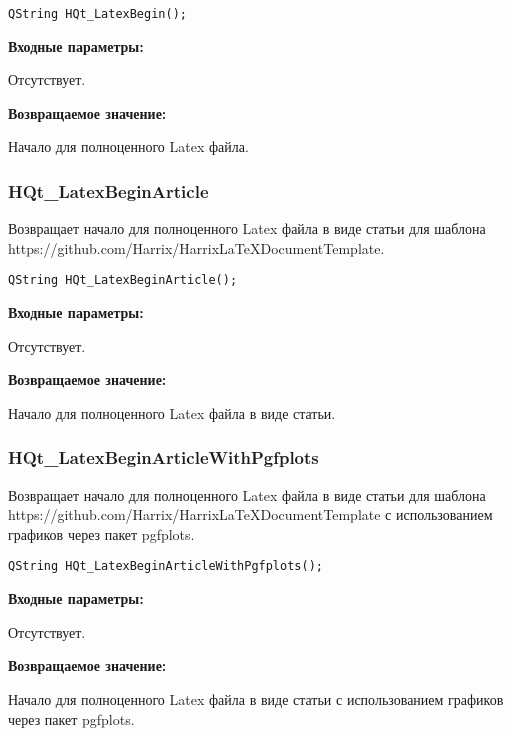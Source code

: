 \documentclass[a4paper,12pt]{article}
\begin{document}
\begin{lstlisting}[label=code_syntax_HQt_LatexBegin,caption=Синтаксис]
QString HQt_LatexBegin();
\end{lstlisting}

\textbf{Входные параметры:}

Отсутствует.

\textbf{Возвращаемое значение:}

Начало для полноценного Latex файла.


\subsubsection{HQt\_LatexBeginArticle}\label{HQt_LatexBeginArticle}

Возвращает начало для полноценного Latex файла в виде статьи для шаблона https://github.com/Harrix/HarrixLaTeXDocumentTemplate.


\begin{lstlisting}[label=code_syntax_HQt_LatexBeginArticle,caption=Синтаксис]
QString HQt_LatexBeginArticle();
\end{lstlisting}

\textbf{Входные параметры:}

Отсутствует.

\textbf{Возвращаемое значение:}

Начало для полноценного Latex файла в виде статьи.


\subsubsection{HQt\_LatexBeginArticleWithPgfplots}\label{HQt_LatexBeginArticleWithPgfplots}

Возвращает начало для полноценного Latex файла в виде статьи для шаблона https://github.com/Harrix/HarrixLaTeXDocumentTemplate с использованием графиков через пакет pgfplots.


\begin{lstlisting}[label=code_syntax_HQt_LatexBeginArticleWithPgfplots,caption=Синтаксис]
QString HQt_LatexBeginArticleWithPgfplots();
\end{lstlisting}

\textbf{Входные параметры:}

Отсутствует.

\textbf{Возвращаемое значение:}

Начало для полноценного Latex файла в виде статьи с использованием графиков через пакет pgfplots.
\end{document}
